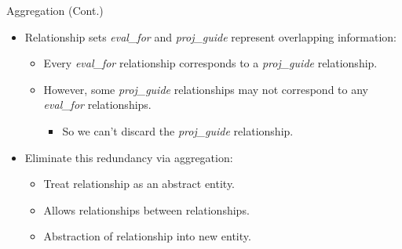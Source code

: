 \documentclass{beamer}
\begin{document}
\begin{frame}{Aggregation (Cont.)}
    \begin{itemize}
        \item Relationship sets \textit{eval\_for} and \textit{proj\_guide} represent overlapping information:
        \begin{itemize}
            \item Every \textit{eval\_for} relationship corresponds to a \textit{proj\_guide} relationship.
            \item However, some \textit{proj\_guide} relationships may not correspond to any \textit{eval\_for} relationships.
            \begin{itemize}
                \item So we can't discard the \textit{proj\_guide} relationship.
            \end{itemize}
        \end{itemize}
        \item Eliminate this redundancy via aggregation:
        \begin{itemize}
            \item Treat relationship as an abstract entity.
            \item Allows relationships between relationships.
            \item Abstraction of relationship into new entity.
        \end{itemize}
    \end{itemize}
\end{frame}
\end{document}
